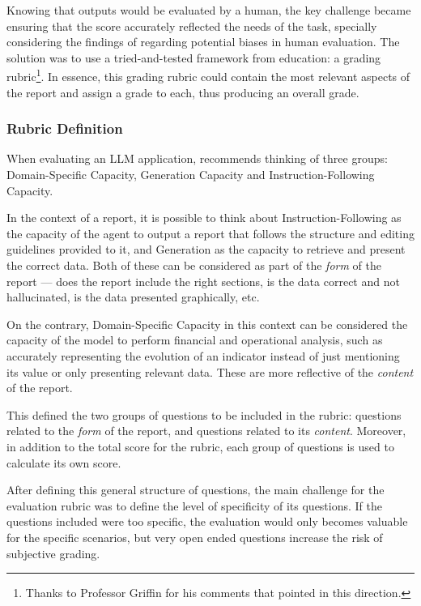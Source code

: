 \documentclass[a4paper]{report}
\begin{document}
Knowing that outputs would be evaluated by a human, the key challenge became ensuring that the score accurately reflected the needs of the task, specially considering the findings of \cite{hu2023decipher} regarding potential biases in human evaluation. The solution was to use a tried-and-tested framework from education: a grading rubric\footnote{Thanks to Professor Griffin for his comments that pointed in this direction.}. In essence, this grading rubric could contain the most relevant aspects of the report and assign a grade to each, thus producing an overall grade. 

\subsubsection{Rubric Definition}

When evaluating an LLM application, \cite{aiebook2025} recommends thinking of three groups: Domain-Specific Capacity, Generation Capacity and Instruction-Following Capacity.

In the context of a report, it is possible to think about Instruction-Following as the capacity of the agent to output a report that follows the structure and editing guidelines provided to it, and Generation as the capacity to retrieve and present the correct data. Both of these can be considered as part of the \textit{form} of the report --- does the report include the right sections, is the data correct and not hallucinated, is the data presented graphically, etc.

On the contrary, Domain-Specific Capacity in this context can be considered the capacity of the model to perform financial and operational analysis, such as  accurately representing the evolution of an indicator instead of just mentioning its value or only presenting relevant data. These are more reflective of the \textit{content} of the report.

This defined the two groups of questions to be included in the rubric: questions related to the \textit{form} of the report, and questions related to its \textit{content}. Moreover, in addition to the total score for the rubric, each group of questions is used to calculate its own score.

After defining this general structure of questions, the main challenge for the evaluation rubric was to define the level of specificity of its questions. If the questions included were too specific, the evaluation would only becomes valuable for the specific scenarios, but very open ended questions increase the risk of subjective grading.
\end{document}
